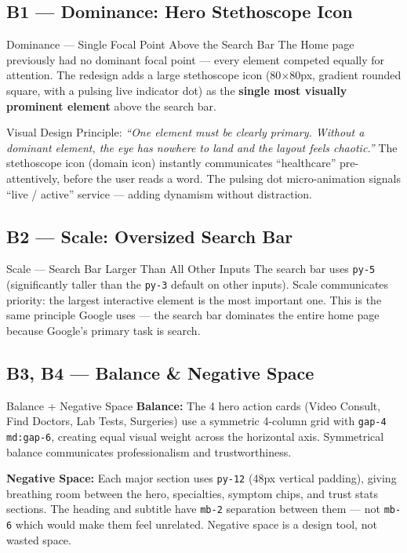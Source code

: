 \documentclass[12pt, a4paper]{article}
\begin{document}
\subsection{B1 --- Dominance: Hero Stethoscope Icon}

\begin{featurebox}{Dominance --- Single Focal Point Above the Search Bar}
The Home page previously had no dominant focal point --- every element competed equally for attention. The redesign adds a large stethoscope icon (80$\times$80px, gradient rounded square, with a pulsing live indicator dot) as the \textbf{single most visually prominent element} above the search bar.

Visual Design Principle: \textit{``One element must be clearly primary. Without a dominant element, the eye has nowhere to land and the layout feels chaotic.''} The stethoscope icon (domain icon) instantly communicates ``healthcare'' pre-attentively, before the user reads a word. The pulsing dot micro-animation signals ``live / active'' service --- adding dynamism without distraction.
\end{featurebox}

\subsection{B2 --- Scale: Oversized Search Bar}

\begin{featurebox}{Scale --- Search Bar Larger Than All Other Inputs}
The search bar uses \texttt{py-5} (significantly taller than the \texttt{py-3} default on other inputs). Scale communicates priority: the largest interactive element is the most important one. This is the same principle Google uses --- the search bar dominates the entire home page because Google's primary task is search.
\end{featurebox}

\subsection{B3, B4 --- Balance \& Negative Space}

\begin{featurebox}{Balance + Negative Space}
\textbf{Balance:} The 4 hero action cards (Video Consult, Find Doctors, Lab Tests, Surgeries) use a symmetric 4-column grid with \texttt{gap-4 md:gap-6}, creating equal visual weight across the horizontal axis. Symmetrical balance communicates professionalism and trustworthiness.

\textbf{Negative Space:} Each major section uses \texttt{py-12} (48px vertical padding), giving breathing room between the hero, specialties, symptom chips, and trust stats sections. The heading and subtitle have \texttt{mb-2} separation between them --- not \texttt{mb-6} which would make them feel unrelated. Negative space is a design tool, not wasted space.
\end{featurebox}
\end{document}
